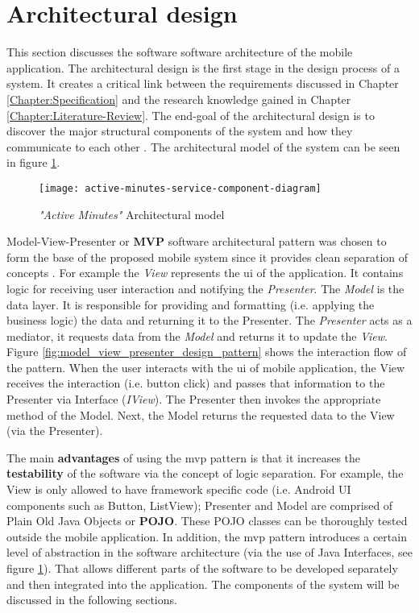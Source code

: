         
    \section{Architectural design}
    This section discusses the software software architecture of the mobile application. The architectural design is the first stage in the design process of a system. It creates a critical link between the requirements discussed in Chapter \ref{Chapter:Specification} and the research knowledge gained in Chapter \ref{Chapter:Literature-Review}. The end-goal of the architectural design is to discover the major structural components of the system and how they communicate to each other \citep[148]{sommerville2010}. The architectural model of the system can be seen in figure \ref{fig:architectural_design_component_diagram}.
    
    \begin{figure}[H]
        \centering
        \texttt{[image: active-minutes-service-component-diagram]}
        \caption{ \textit{"Active Minutes"} Architectural model}
        \label{fig:architectural_design_component_diagram}
    \end{figure}
    
    Model-View-Presenter or \textbf{MVP} software architectural pattern was chosen to form the base of the proposed mobile system since it provides clean separation of concepts \citep[532]{zhang2010}. For example the \textit{View} represents the \gls{ui} of the application. It contains logic for receiving user interaction and notifying the \textit{Presenter}. The \textit{Model} is the data layer. It is responsible for providing and formatting (i.e. applying the business logic) the data and returning it to the Presenter. The \textit{Presenter} acts as a mediator, it requests data from the \textit{Model} and returns it to update the \textit{View}. Figure \ref{fig:model_view_presenter_design_pattern} shows the interaction flow of the pattern. When the user interacts with the \gls{ui} of mobile application, the View receives the interaction (i.e. button click) and passes that information to the Presenter via Interface (\textit{IView}). The Presenter then invokes the appropriate method of the Model. Next, the Model returns the requested data to the View (via the Presenter). 
        
    The main \textbf{advantages} of using the \gls{mvp} pattern is that it increases the \textbf{testability} of the software via the concept of logic separation. For example, the View is only allowed to have framework specific code (i.e. Android UI components such as Button, ListView); Presenter and Model are comprised of Plain Old Java Objects or \textbf{POJO}. These POJO classes can be thoroughly tested outside the mobile application. In addition, the \gls{mvp} pattern introduces a certain level of abstraction in the software architecture (via the use of Java Interfaces, see figure \ref{fig:architectural_design_component_diagram}). That allows different parts of the software to be developed separately and then integrated into the application. The components of the system will be discussed in the following sections.
    

